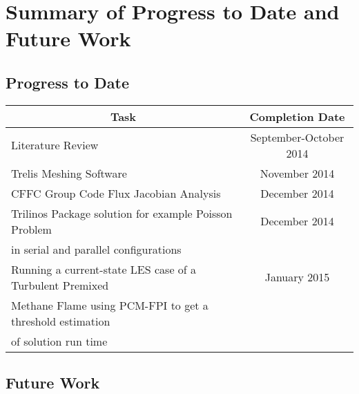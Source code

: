 \section{Summary of Progress to Date and Future Work}

\subsection{Progress to Date}

\begin{tabular}{|l|c|} \hline
\multicolumn{1}{|c|}{\bf{Task}} & \multicolumn{1}{|c|}{\bf{Completion Date}} \\

\hline Literature Review & September-October 2014 \\

\hline Trelis Meshing Software & November 2014 \\

\hline CFFC Group Code Flux Jacobian Analysis & December 2014 \\

\hline Trilinos Package solution for example Poisson Problem & December 2014 \\in serial and parallel configurations & \\

\hline Running a current-state LES case of a Turbulent Premixed & January 2015 \\Methane Flame using PCM-FPI to get a threshold estimation & \\ of solution run time &\\

\hline
\end{tabular}

\subsection{Future Work}

